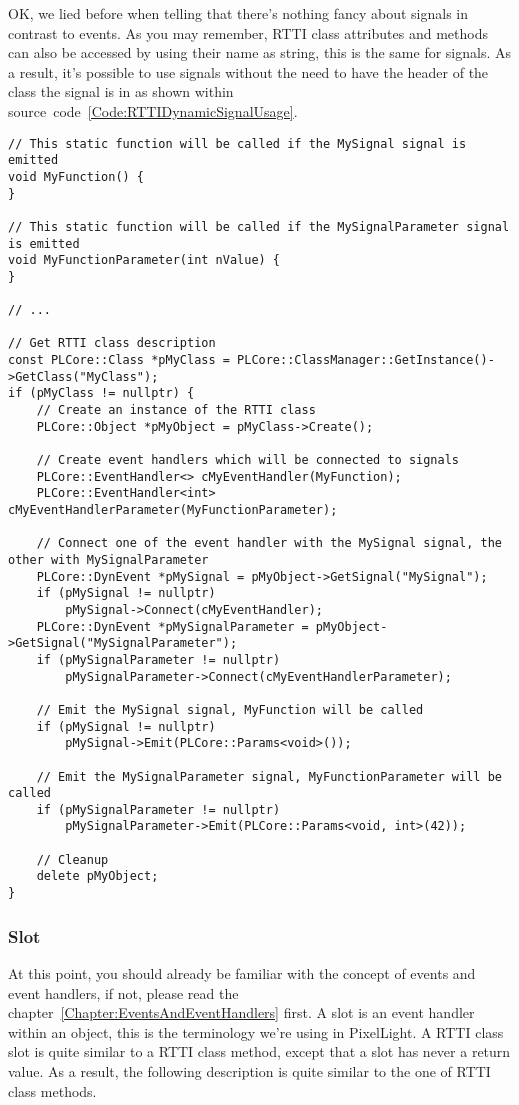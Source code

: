 OK, we lied before when telling that there's nothing fancy about signals in contrast to events. As you may remember, RTTI class attributes and methods can also be accessed by using their name as string, this is the same for signals. As a result, it's possible to use signals without the need to have the header of the class the signal is in as shown within source~code~\ref{Code:RTTIDynamicSignalUsage}.
\begin{lstlisting}[label=Code:RTTIDynamicSignalUsage,caption={Using signals of a RTTI class dynamically}]
// This static function will be called if the MySignal signal is emitted
void MyFunction() {
}

// This static function will be called if the MySignalParameter signal is emitted
void MyFunctionParameter(int nValue) {
}

// ...

// Get RTTI class description
const PLCore::Class *pMyClass = PLCore::ClassManager::GetInstance()->GetClass("MyClass");
if (pMyClass != nullptr) {
	// Create an instance of the RTTI class
	PLCore::Object *pMyObject = pMyClass->Create();

	// Create event handlers which will be connected to signals
	PLCore::EventHandler<> cMyEventHandler(MyFunction);
	PLCore::EventHandler<int> cMyEventHandlerParameter(MyFunctionParameter);

	// Connect one of the event handler with the MySignal signal, the other with MySignalParameter
	PLCore::DynEvent *pMySignal = pMyObject->GetSignal("MySignal");
	if (pMySignal != nullptr)
		pMySignal->Connect(cMyEventHandler);
	PLCore::DynEvent *pMySignalParameter = pMyObject->GetSignal("MySignalParameter");
	if (pMySignalParameter != nullptr)
		pMySignalParameter->Connect(cMyEventHandlerParameter);

	// Emit the MySignal signal, MyFunction will be called
	if (pMySignal != nullptr)
		pMySignal->Emit(PLCore::Params<void>());

	// Emit the MySignalParameter signal, MyFunctionParameter will be called
	if (pMySignalParameter != nullptr)
		pMySignalParameter->Emit(PLCore::Params<void, int>(42));

	// Cleanup
	delete pMyObject;
}
\end{lstlisting}



\subsubsection{Slot}
At this point, you should already be familiar with the concept of events and event handlers, if not, please read the chapter~\ref{Chapter:EventsAndEventHandlers} first. A slot is an event handler within an object, this is the terminology we're using in PixelLight. A RTTI class slot is quite similar to a RTTI class method, except that a slot has never a return value. As a result, the following description is quite similar to the one of RTTI class methods.

